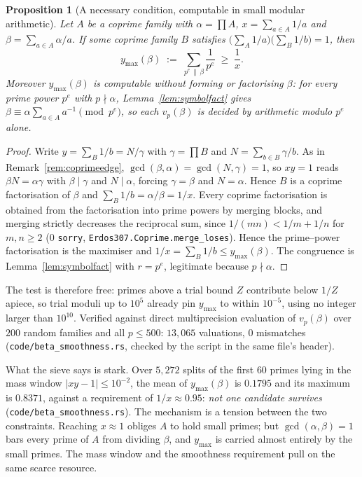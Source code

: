 \documentclass[11pt]{article}
\newtheorem{proposition}[theorem]{Proposition}
\theoremstyle{definition}
\begin{document}
\begin{proposition}[A necessary condition, computable in small modular arithmetic]\label{prop:coprimesieve}
Let $A$ be a coprime family with $\alpha=\prod A$, $x=\sum_{a\in A}1/a$ and
$\beta=\sum_{a\in A}\alpha/a$. If some coprime family $B$ satisfies $\bigl(\sum_A1/a\bigr)
\bigl(\sum_B1/b\bigr)=1$, then
\[ y_{\max}(\beta)\;:=\;\sum_{p^e\,\|\,\beta}\frac1{p^e}\;\ge\;\frac1x .\]
Moreover $y_{\max}(\beta)$ is computable without forming or factorising $\beta$: for every prime
power $p^e$ with $p\nmid\alpha$, Lemma~\ref{lem:symbolfact} gives
$\beta\equiv\alpha\sum_{a\in A}a^{-1}\pmod{p^e}$, so each $v_p(\beta)$ is decided by arithmetic
modulo $p^e$ alone.
\end{proposition}
\begin{proof}
Write $y=\sum_B1/b=N/\gamma$ with $\gamma=\prod B$ and $N=\sum_{b\in B}\gamma/b$. As in
Remark~\ref{rem:coprimeedge}, $\gcd(\beta,\alpha)=\gcd(N,\gamma)=1$, so $xy=1$ reads
$\beta N=\alpha\gamma$ with $\beta\mid\gamma$ and $N\mid\alpha$, forcing $\gamma=\beta$ and
$N=\alpha$. Hence $B$ is a coprime factorisation of $\beta$ and $\sum_B1/b=\alpha/\beta=1/x$. Every coprime factorisation is obtained
from the factorisation into prime powers by merging blocks, and merging strictly decreases the
reciprocal sum, since $1/(mn)<1/m+1/n$ for $m,n\ge2$ \textup{(}$0$ \texttt{sorry},
\texttt{Erdos307.Coprime.merge\_loses}\textup{)}. Hence the prime--power factorisation is the
maximiser and $1/x=\sum_B1/b\le y_{\max}(\beta)$. The congruence is
Lemma~\ref{lem:symbolfact} with $r=p^e$, legitimate because $p\nmid\alpha$.
\end{proof}

The test is therefore free: primes above a trial bound $Z$ contribute below $1/Z$ apiece, so trial
moduli up to $10^5$ already pin $y_{\max}$ to within $10^{-5}$, using no integer larger than $10^{10}$.
Verified against direct multiprecision evaluation of $v_p(\beta)$ over $200$ random families and all
$p\le500$: $13{,}065$ valuations, $0$ mismatches \textup{(\texttt{code/beta\_smoothness.rs},
checked by the script in the same file's header)}.

What the sieve says is stark. Over $5{,}272$ splits of the first $60$ primes lying in the mass window
$|xy-1|\le10^{-2}$, the mean of $y_{\max}(\beta)$ is $0.1795$ and its maximum is $0.8371$, against a
requirement of $1/x\approx0.95$: \emph{not one candidate survives}
\textup{(\texttt{code/beta\_smoothness.rs})}. The mechanism is a tension between the two constraints.
Reaching $x\approx1$ obliges $A$ to hold small primes; but $\gcd(\alpha,\beta)=1$ bars every prime of
$A$ from dividing $\beta$, and $y_{\max}$ is carried almost entirely by the small primes. The mass
window and the smoothness requirement pull on the same scarce resource.
\end{document}

